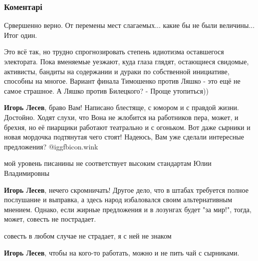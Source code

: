  
 
 
 
 
\subsubsection{Коментарі}
\label{sec:03_06_2018.fb.lesev_igor.1.poroshenko_timoshenko.cmt}

\begin{itemize} %
Срвершенно верно. От перемены мест слагаемых... какие бы не были величины... Итог один.


Это всё так, но трудно спрогнозировать степень идиотизма оставшегося
электората. Пока вменяемые уезжают, куда глаза глядят, остающиеся свидомые,
активисты, бандиты на содержании и дураки по собственной инициативе, способны
на многое. Вариант финала Тимошенко против Ляшко - это ещё не самое страшное. А
Ляшко против Билецкого? - Проще утопиться))


\textbf{Игорь Лесев}, браво Вам! Написано блестяще, с юмором и с правдой жизни. Достойно.
Ходят слухи, что Вона не жлобится на работников пера, может, и брехня, но её пиарщики работают театрально и с огоньком. Вот даже сырники и новая мордочка подтянутая чего стоят!
Надеюсь, Вам уже сделали интересные предложения?  @igg{fbicon.wink} 

\begin{itemize} %
мой уровень писанины не соответствует высоким стандартам Юлии Владимировны

\textbf{Игорь Лесев}, нечего скромничать! Другое дело, что в штабах требуется полное послушание и выправка, а здесь народ избаловался своим альтернативным мнением. Однако, если жирные предложения и в лозунгах будет "за мир!", тогда, может, совесть не пострадает.

совесть в любом случае не страдает, я с ней не знаком

\textbf{Игорь Лесев}, чтобы на кого-то работать, можно и не пить чай с сырниками.
\end{itemize} %


\end{itemize}
